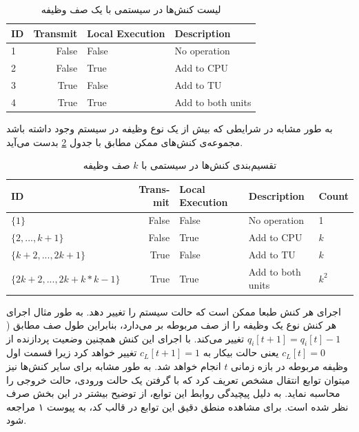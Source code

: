 \begin{table}[H]
	\centering
	\begin{latin}
		\begin{tabular}{@{}lrll@{}}
			\toprule
			\textbf{ID} & \textbf{Transmit} & \textbf{Local Execution} & \textbf{Description} \\ \midrule
			1           & False             & False                    & No operation         \\
			2           & False             & True                     & Add to CPU           \\
			3           & True              & False                    & Add to TU            \\
			4           & True              & True                     & Add to both units    \\ \bottomrule
		\end{tabular}
	\end{latin}
	\caption{لیست کنش‌ها در سیستمی با یک صف وظیفه}
	\label{table:actions}
\end{table}
به طور مشابه در شرایطی که بیش از یک نوع وظیفه در سیستم وجود داشته باشد مجموعه‌ی کنش‌های ممکن مطابق با جدول \ref{table:actions-multiqueue} بدست می‌آید.
\begin{table}[H]
	\centering
	\begin{latin}
		\begin{tabular}{@{}lrlll@{}}
			\toprule
			\textbf{ID}                     & \textbf{Transmit} & \textbf{Local Execution} & \textbf{Description} & \textbf{Count}                \\ \midrule
			$\{1\}$                           & False             & False                    & No operation         & 1                    \\
			$\{2, ..., k + 1\}$               & False             & True                     & Add to CPU           & $k$                    \\
			$\{k + 2, ..., 2k + 1\}$          & True              & False                    & Add to TU            & $k$                    \\
			$\{2k + 2, ..., 2k + k * k - 1\}$ & True              & True                     & Add to both units    & $k^2$ \\ \bottomrule
		\end{tabular}
	\end{latin}
	\caption{تقسیم‌بندی کنش‌ها در سیستمی با $k$ صف وظیفه}
	\label{table:actions-multiqueue}
\end{table}
اجرای هر کنش طبعا ممکن است که حالت سیستم را تغییر دهد. به طور مثال اجرای هر کنش نوع  یک وظیفه را از صف مربوطه بر می‌دارد، بنابراین طول صف مطابق (\(q_i[t + 1] = q_i[t] - 1\) تغییر می‌کند. با اجرای این کنش همچنین وضعیت پردازنده از \(c_L[t] = 0\) یعنی حالت بیکار به \(c_L[t + 1] = 1\) تغییر خواهد کرد زیرا قسمت اول وظیفه مربوطه در بازه زمانی \(t\) انجام خواهد شد. به طور مشابه برای سایر کنش‌ها نیز میتوان توابع انتقال مشخص تعریف کرد که با گرفتن یک حالت ورودی، حالت خروجی را محاسبه نماید. به دلیل پیچیدگی روابط این توابع، از توضیح بیشتر در این بخش صرف نظر شده است. برای مشاهده منطق دقیق این توابع در قالب کد، به پیوست ۱ مراجعه شود.
